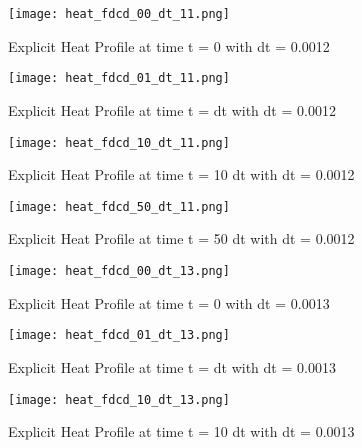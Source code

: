\documentclass[a4paper,12pt,titlepage]{article}
\newcommand{\scale}{0.5}
\begin{document}
\begin{figure}[H]
  \begin{center}
    \texttt{[image: heat\_fdcd\_00\_dt\_11.png]}
    \caption{Explicit Heat Profile at time t = 0 with dt = 0.0012}
  \end{center}
\end{figure}

\begin{figure}[H]
  \begin{center}
    \texttt{[image: heat\_fdcd\_01\_dt\_11.png]}
    \caption{Explicit Heat Profile at time t = dt with dt = 0.0012}
  \end{center}
\end{figure}

\begin{figure}[H]
  \begin{center}
    \texttt{[image: heat\_fdcd\_10\_dt\_11.png]}
    \caption{Explicit Heat Profile at time t = 10 dt with dt = 0.0012}
  \end{center}
\end{figure}

\begin{figure}[H]
  \begin{center}
    \texttt{[image: heat\_fdcd\_50\_dt\_11.png]}
    \caption{Explicit Heat Profile at time t = 50 dt with dt = 0.0012}
  \end{center}
\end{figure}

\begin{figure}[H]
  \begin{center}
    \texttt{[image: heat\_fdcd\_00\_dt\_13.png]}
    \caption{Explicit Heat Profile at time t = 0 with dt = 0.0013}
  \end{center}
\end{figure}

\begin{figure}[H]
  \begin{center}
    \texttt{[image: heat\_fdcd\_01\_dt\_13.png]}
    \caption{Explicit Heat Profile at time t = dt with dt = 0.0013}
  \end{center}
\end{figure}

\begin{figure}[H]
  \begin{center}
    \texttt{[image: heat\_fdcd\_10\_dt\_13.png]}
    \caption{Explicit Heat Profile at time t = 10 dt with dt = 0.0013}
  \end{center}
\end{figure}
\end{document}
